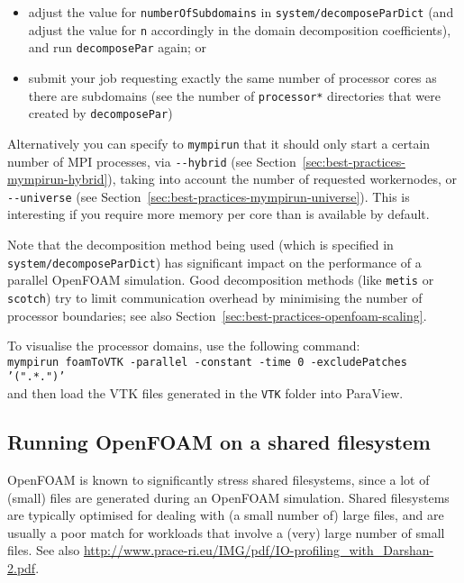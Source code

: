 \begin{itemize}
\item adjust the value for {\small\texttt{numberOfSubdomains}} in {\small\texttt{system/decomposeParDict}}
(and adjust the value for {\small\texttt{n}} accordingly in the domain decomposition coefficients),
and run {\small\texttt{decomposePar}} again; or
\item submit your job requesting exactly the same number of processor cores as there are subdomains (see the
number of {\small\texttt{processor*}} directories that were created by {\small\texttt{decomposePar}})
\end{itemize}

Alternatively you can specify to \texttt{mympirun} that it should only start a certain number of MPI processes,
via {\small\texttt{-{}-hybrid}} (see Section~\ref{sec:best-practices-mympirun-hybrid}),
taking into account the number of requested workernodes,
or {\small\texttt{-{}-universe}} (see Section~\ref{sec:best-practices-mympirun-universe}).
This is interesting if you require more memory per core than is available by default.

Note that the decomposition method being used (which is specified in {\small\texttt{system/decomposeParDict}})
has significant impact on the performance of a parallel OpenFOAM simulation. Good decomposition methods (like
{\small\texttt{metis}} or {\small\texttt{scotch}}) try to limit communication overhead by minimising the number
of processor boundaries; see also Section~\ref{sec:best-practices-openfoam-scaling}.

To visualise the processor domains, use the following command:\\
{\small\texttt{mympirun foamToVTK -parallel -constant -time 0 -excludePatches '(".*.")'}}\\
and then load the VTK files generated in the {\small\texttt{VTK}} folder into ParaView.


\subsection{Running OpenFOAM on a shared filesystem}
\label{sec:best-practices-openfoam-shared-filesystems}

OpenFOAM is known to significantly stress shared filesystems, since a lot of (small) files are generated
during an OpenFOAM simulation. Shared filesystems are typically optimised for dealing with (a small number of)
large files, and are usually a poor match for workloads that involve a (very) large number of small files.
See also {\small\url{http://www.prace-ri.eu/IMG/pdf/IO-profiling_with_Darshan-2.pdf}}.

